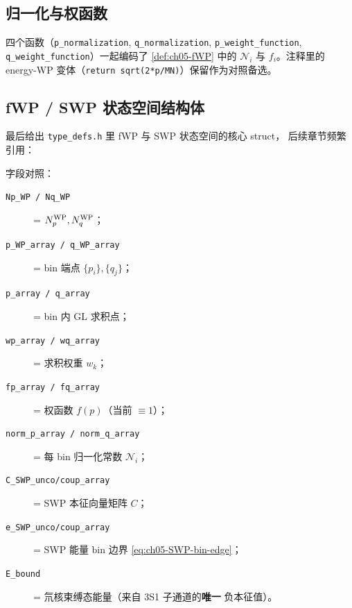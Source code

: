 \subsection{归一化与权函数}
\label{subsec:ch05-code-norm}



四个函数（\texttt{p\_normalization}, \texttt{q\_normalization},
\texttt{p\_weight\_function}, \texttt{q\_weight\_function}）一起编码了
\cref{def:ch05-fWP} 中的 \(\mathcal{N}_i\) 与 \(f_i\)。注释里的 energy-WP
变体（\texttt{return sqrt(2*p/MN)}）保留作为对照备选。

\subsection{fWP / SWP 状态空间结构体}
\label{subsec:ch05-code-typedefs}

最后给出 \texttt{type\_defs.h} 里 fWP 与 SWP 状态空间的核心 struct，
后续章节频繁引用：



字段对照：
\begin{description}
  \item[\texttt{Np\_WP / Nq\_WP}] = \({N_{p}^{\text{WP}}}, {N_{q}^{\text{WP}}}\)；
  \item[\texttt{p\_WP\_array / q\_WP\_array}] = bin 端点 \(\{p_i\}, \{q_j\}\)；
  \item[\texttt{p\_array / q\_array}] = bin 内 GL 求积点；
  \item[\texttt{wp\_array / wq\_array}] = 求积权重 \(w_k\)；
  \item[\texttt{fp\_array / fq\_array}] = 权函数 \(f(p)\)（当前 \(\equiv 1\)）；
  \item[\texttt{norm\_p\_array / norm\_q\_array}] = 每 bin 归一化常数 \(\mathcal{N}_i\)；
  \item[\texttt{C\_SWP\_unco/coup\_array}] = SWP 本征向量矩阵 \(C\)；
  \item[\texttt{e\_SWP\_unco/coup\_array}] = SWP 能量 bin 边界
        \cref{eq:ch05-SWP-bin-edge}；
  \item[\texttt{E\_bound}] = 氘核束缚态能量（来自 3S1 子通道的\textbf{唯一}
        负本征值）。
\end{description}

